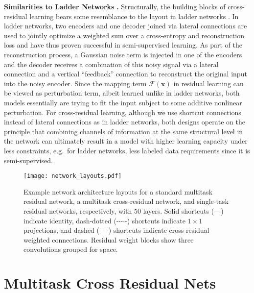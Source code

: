 \documentclass{sig-alternate-05-2015}
\newcommand{\mb}{\mathbf}
\begin{document}
\vspace{1.6mm}
\noindent \textbf{Similarities to Ladder Networks} \cite{ramus_2015}\textbf{.}
Structurally, the building blocks of cross-residual learning bears some resemblance to the layout in ladder networks \cite{ramus_2015}.
In ladder networks, two encoders and one decoder joined via lateral connections are used to jointly optimize a weighted sum over a cross-entropy and reconstruction loss and have thus proven successful in semi-supervised learning.
As part of the reconstruction process, a Gaussian noise term is injected in one of the encoders and the decoder receives a combination of this noisy signal via a lateral connection and a vertical ``feedback'' connection to reconstruct the original input into the noisy encoder.
Since the mapping term $\mathcal{F}(\mb x)$ in residual learning can be viewed as perturbation term, albeit learned unlike in ladder networks, both models essentially are trying to fit the input subject to some additive nonlinear perturbation.
For cross-residual learning, although we use shortcut connections instead of lateral connections as in ladder networks, both designs operate on the principle that combining channels of information at the same structural level in the network can ultimately result in a model with higher learning capacity under less constraints, e.g.~for ladder networks, less labeled data requirements since it is semi-supervised.

\begin{figure*}[t]
  \centering
  \texttt{[image: network\_layouts.pdf]}
  \caption{Example network architecture layouts for a standard multitask residual network, a multitask cross-residual network, and single-task residual networks, respectively, with 50 layers. Solid shortcuts (---) indicate identity, dash-dotted (-$\cdot$-$\cdot$-) shortcuts indicate $1\times1$ projections, and dashed (-$\,$-$\,$-) shortcuts indicate cross-residual weighted connections. Residual weight blocks show three convolutions grouped for space.}
  \label{fig:network_layouts}
\end{figure*}

\section{Multitask Cross Residual Nets}
\label{sec:mt_xresidual}
\end{document}
